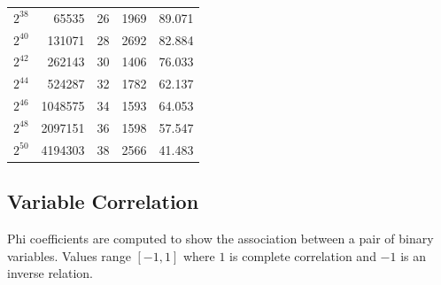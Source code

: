 \documentclass[runningheads]{llncs}
\begin{document}
\begin{table}[!h]
\begin{tabular}{rrrrr}
		\rowcolor[HTML]{FFFFFF} 
		$2^{38}$                                                              & 65535                                                                            & 26                           & 1969                      & 89.071                       \\
		\rowcolor[HTML]{FFFFFF} 
		$2^{40}$                                                              & 131071                                                                           & 28                           & 2692                      & 82.884                       \\
		\rowcolor[HTML]{FFFFFF} 
		$2^{42}$                                                              & 262143                                                                           & 30                           & 1406                      & 76.033                       \\
		\rowcolor[HTML]{FFFFFF} 
		$2^{44}$                                                              & 524287                                                                           & 32                           & 1782                      & 62.137                       \\
		\rowcolor[HTML]{FFFFFF} 
		$2^{46}$                                                              & 1048575                                                                          & 34                           & 1593                      & 64.053                       \\
		\rowcolor[HTML]{FFFFFF} 
		$2^{48}$                                                              & 2097151                                                                          & 36                           & 1598                      & 57.547                       \\
		\rowcolor[HTML]{FFFFFF} 
		$2^{50}$                                                              & 4194303                                                                          & 38                           & 2566                      & 41.483                       \\ \hline
	\end{tabular}
\end{table}

\subsection{Variable Correlation}

Phi coefficients are computed to show the association between a pair of binary variables. Values range $[-1,1]$ where $1$ is complete correlation and $-1$ is an inverse relation.  
\end{document}
